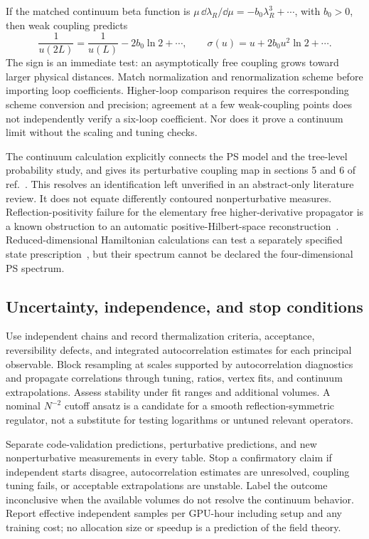 If the matched continuum beta function is $\mu\,\dd\lambda_R/\dd\mu=-b_0\lambda_R^3+\cdots$, with $b_0>0$, then weak coupling predicts
\begin{equation}
 \frac{1}{u(2L)}=\frac{1}{u(L)}-2b_0\ln2+\cdots,
 \qquad\sigma(u)=u+2b_0u^2\ln2+\cdots.
 \label{eq:step-scaling-prediction}
\end{equation}
The sign is an immediate test: an asymptotically free coupling grows toward larger physical distances.  Match normalization and renormalization scheme before importing loop coefficients.  Higher-loop comparison requires the corresponding scheme conversion and precision; agreement at a few weak-coupling points does not independently verify a six-loop coefficient.  Nor does it prove a continuum limit without the scaling and tuning checks.

The continuum calculation explicitly connects the PS model and the tree-level probability study, and gives its perturbative coupling map in sections 5 and 6 of ref.~\cite{Anderson:2026}.  This resolves an identification left unverified in an abstract-only literature review.  It does not equate differently contoured nonperturbative measures.  Reflection-positivity failure for the elementary free higher-derivative propagator is a known obstruction to an automatic positive-Hilbert-space reconstruction~\cite{Arici:2018}.  Reduced-dimensional Hamiltonian calculations can test a separately specified state prescription~\cite{Holdom:2024Ghosts}, but their spectrum cannot be declared the four-dimensional PS spectrum.

\subsection{Uncertainty, independence, and stop conditions}

Use independent chains and record thermalization criteria, acceptance, reversibility defects, and integrated autocorrelation estimates for each principal observable.  Block resampling at scales supported by autocorrelation diagnostics and propagate correlations through tuning, ratios, vertex fits, and continuum extrapolations.  Assess stability under fit ranges and additional volumes.  A nominal $N^{-2}$ cutoff ansatz is a candidate for a smooth reflection-symmetric regulator, not a substitute for testing logarithms or untuned relevant operators.

Separate code-validation predictions, perturbative predictions, and new nonperturbative measurements in every table.  Stop a confirmatory claim if independent starts disagree, autocorrelation estimates are unresolved, coupling tuning fails, or acceptable extrapolations are unstable.  Label the outcome inconclusive when the available volumes do not resolve the continuum behavior.  Report effective independent samples per GPU-hour including setup and any training cost; no allocation size or speedup is a prediction of the field theory.
